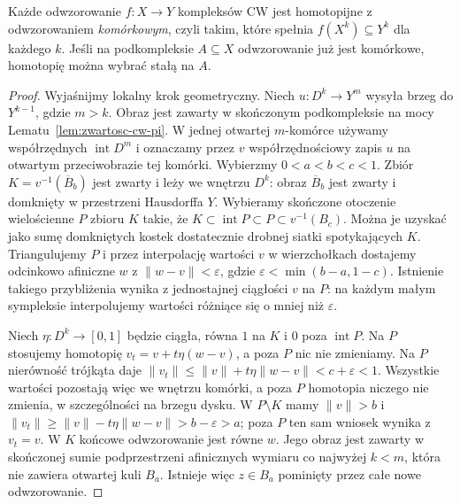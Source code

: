 \begin{twierdzenie}
\label{thm:przyblizenie-komorkowe}
Każde odwzorowanie $f:X\to Y$ kompleksów CW
jest homotopijne z odwzorowaniem
\emph{komórkowym}, czyli takim,
które spełnia
$f(X^k)\subseteq Y^k$ dla
każdego $k$. Jeśli na
podkompleksie $A\subseteq X$
odwzorowanie już jest komórkowe,
homotopię można wybrać
stałą na $A$.
\end{twierdzenie}
\begin{proof}
Wyjaśnijmy lokalny krok geometryczny. Niech
$u:D^k\to Y^m$ wysyła brzeg do $Y^{k-1}$, gdzie $m>k$.
Obraz jest zawarty w skończonym podkompleksie na mocy
Lematu~\ref{lem:zwartosc-cw-pi}. W jednej otwartej $m$-komórce
używamy współrzędnych $\operatorname{int}D^m$ i oznaczamy przez $v$
współrzędnościowy zapis $u$ na otwartym przeciwobrazie tej komórki.
Wybierzmy $0<a<b<c<1$. Zbiór $K=v^{-1}(\overline B_b)$
jest zwarty i leży we wnętrzu $D^k$: obraz $\overline B_b$
jest zwarty i domknięty w przestrzeni Hausdorffa $Y$.
Wybieramy skończone otoczenie wielościenne $P$ zbioru $K$
takie, że $K\subset\operatorname{int}P\subset P\subset v^{-1}(B_c)$.
Można je uzyskać jako sumę domkniętych kostek dostatecznie drobnej siatki
spotykających $K$. Triangulujemy $P$ i przez interpolację wartości $v$
w wierzchołkach dostajemy odcinkowo afiniczne $w$ z
$\|w-v\|<\varepsilon$, gdzie $\varepsilon<\min(b-a,1-c)$.
Istnienie takiego przybliżenia wynika z jednostajnej ciągłości $v$ na $P$:
na każdym małym sympleksie interpolujemy wartości różniące się o mniej niż $\varepsilon$.

Niech $\eta:D^k\to[0,1]$ będzie ciągła, równa $1$ na $K$
i $0$ poza $\operatorname{int}P$. Na $P$ stosujemy homotopię
$v_t=v+t\eta(w-v)$, a poza $P$ nic nie zmieniamy.
Na $P$ nierówność trójkąta daje
$\|v_t\|\leq\|v\|+t\eta\|w-v\|<c+\varepsilon<1$.
Wszystkie wartości pozostają więc we wnętrzu komórki,
a poza $P$ homotopia niczego nie zmienia, w szczególności na brzegu dysku.
W $P\setminus K$ mamy $\|v\|>b$ i
$\|v_t\|\geq\|v\|-t\eta\|w-v\|>b-\varepsilon>a$;
poza $P$ ten sam wniosek wynika z $v_t=v$.
W $K$ końcowe odwzorowanie jest równe $w$.
Jego obraz jest zawarty w skończonej sumie podprzestrzeni afinicznych
wymiaru co najwyżej $k<m$, która nie zawiera otwartej kuli $B_a$.
Istnieje więc $z\in B_a$ pominięty przez całe nowe odwzorowanie.


\end{proof}
